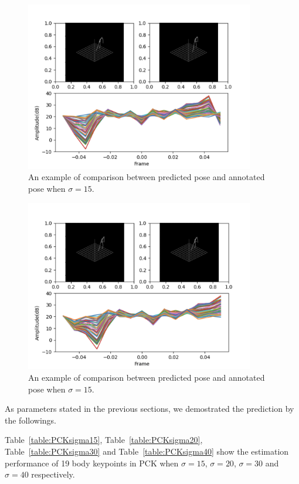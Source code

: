 \documentclass[10pt,letterpaper]{article}
\begin{document}
	
	\begin{figure}[htbp]
		\centerline{\includegraphics[width=100mm,scale=0.2]{PREDANNO01.png}}
		\caption{An example of comparison between predicted pose and annotated pose when $\sigma=15$.}
		\label{fig:PREDANNO01}
	\end{figure}
	\begin{figure}[htbp]
		\centerline{\includegraphics[width=100mm,scale=0.2]{PREDANNO02.png}}
		\caption{An example of comparison between predicted pose and annotated pose when $\sigma=15$.}
		\label{fig:PREDANNO02}
	\end{figure}
	
	
	As parameters stated in the previous sections, we demostrated the prediction by the followings.
	
	Table~\ref{table:PCKsigma15}, Table~\ref{table:PCKsigma20}, Table~\ref{table:PCKsigma30} and  Table~\ref{table:PCKsigma40} show the estimation performance of 19 body keypoints in PCK when $\sigma=15$, $\sigma=20$, $\sigma=30$ and $\sigma=40$ respectively.
\end{document}
